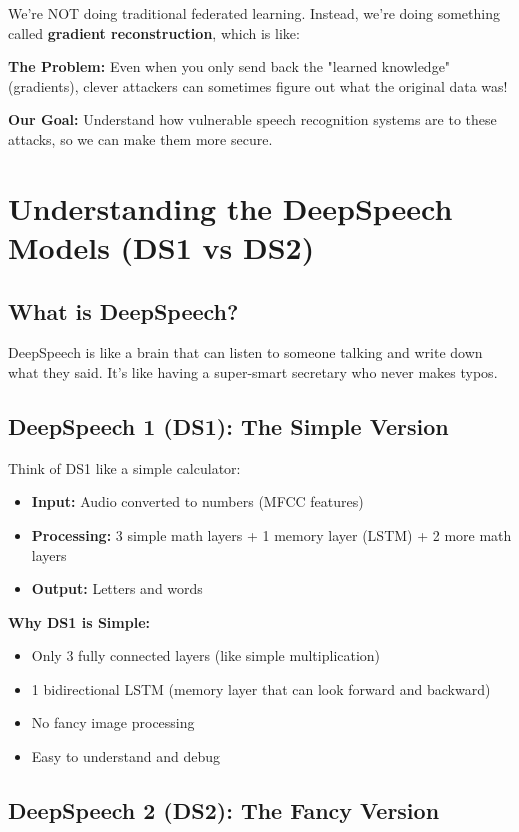 \documentclass[12pt]{article}
\begin{document}
We're NOT doing traditional federated learning. Instead, we're doing something called \textbf{gradient reconstruction}, which is like:

\textbf{The Problem:} Even when you only send back the "learned knowledge" (gradients), clever attackers can sometimes figure out what the original data was!

\textbf{Our Goal:} Understand how vulnerable speech recognition systems are to these attacks, so we can make them more secure.

\section{Understanding the DeepSpeech Models (DS1 vs DS2)}

\subsection{What is DeepSpeech?}

DeepSpeech is like a brain that can listen to someone talking and write down what they said. It's like having a super-smart secretary who never makes typos.

\subsection{DeepSpeech 1 (DS1): The Simple Version}

Think of DS1 like a simple calculator:
\begin{itemize}
    \item \textbf{Input:} Audio converted to numbers (MFCC features)
    \item \textbf{Processing:} 3 simple math layers + 1 memory layer (LSTM) + 2 more math layers
    \item \textbf{Output:} Letters and words
\end{itemize}

\textbf{Why DS1 is Simple:}
\begin{itemize}
    \item Only 3 fully connected layers (like simple multiplication)
    \item 1 bidirectional LSTM (memory layer that can look forward and backward)
    \item No fancy image processing
    \item Easy to understand and debug
\end{itemize}

\subsection{DeepSpeech 2 (DS2): The Fancy Version}
\end{document}
